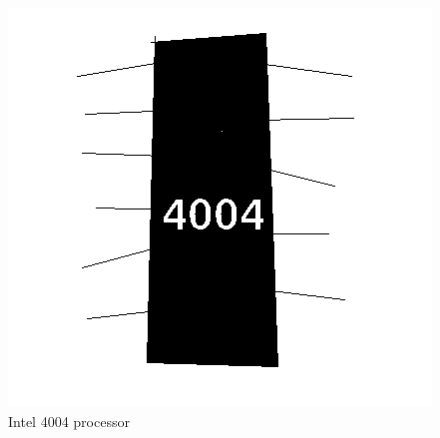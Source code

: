 \begin{figure}
	\includegraphics[width=\linewidth]{4004.jpg}
	\caption{Intel 4004 processor \cite{RN9}}
	\label{fig:4004}
\end{figure}

